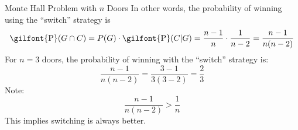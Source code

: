 \documentclass[
  ignorenonframetext,
]{beamer}
\begin{document}
\begin{frame}{Monte Hall Problem with \(n\) Doors}
\label{monte-hall-problem-with-n-doors-1}
In other words, the probability of winning using the ``switch'' strategy
is
\[\textrm{\gilfont{P}}\normalfont (G \cap C)=P(G)\cdot \textrm{\gilfont{P}}\normalfont (C|G)=\frac{n-1}{n}\cdot \frac{1}{n-2}=\frac{n-1}{n(n-2)}\]
For \(n=3\) doors, the probability of winning with the ``switch''
strategy is: \[\frac{n-1}{n(n-2)}=\frac{3-1}{3(3-2)}=\frac{2}{3}\] Note:
\[\frac{n-1}{n(n-2)}> \frac{1}{n}\] This implies switching is always
better.
\end{frame}
\end{document}
